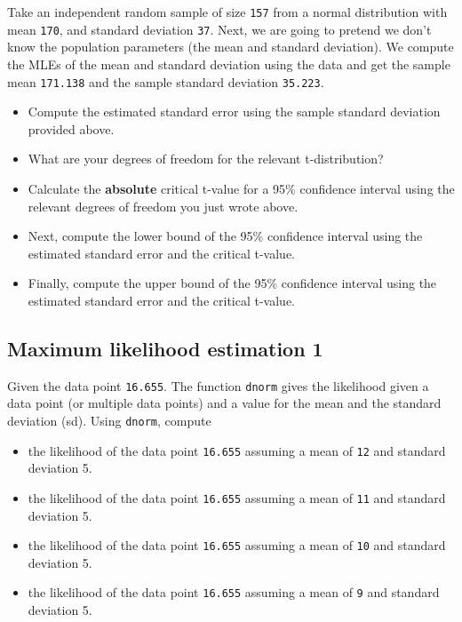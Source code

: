 \documentclass[12pt,]{krantz}
\providecommand{\tightlist}{%
  \setlength{\itemsep}{0pt}\setlength{\parskip}{0pt}}
\begin{document}
Take an independent random sample of size \texttt{157} from a normal distribution
with mean \texttt{170}, and standard deviation \texttt{37}. Next, we are going to pretend we don't know the population parameters (the mean and standard deviation). We compute the MLEs of the mean and standard deviation using the data and get the sample mean \texttt{171.138} and the sample standard deviation \texttt{35.223}.

\begin{itemize}
\tightlist
\item
  Compute the estimated standard error using the sample standard deviation provided above.
\item
  What are your degrees of freedom for the relevant t-distribution?
\item
  Calculate the \textbf{absolute} critical t-value for a 95\% confidence interval using the relevant degrees of freedom you just wrote above.
\item
  Next, compute the lower bound of the 95\% confidence interval using the estimated standard error and the critical t-value.
\item
  Finally, compute the upper bound of the 95\% confidence interval using the estimated standard error and the critical t-value.
\end{itemize}

\hypertarget{sec:FoundationsexercisesMLE1}{%
\subsection{Maximum likelihood estimation 1}\label{sec:FoundationsexercisesMLE1}}

Given the data point \texttt{16.655}.
The function \texttt{dnorm} gives the likelihood given a data point (or multiple data points) and a value for the mean and the standard deviation (sd). Using \texttt{dnorm}, compute

\begin{itemize}
\tightlist
\item
  the likelihood of the data point \texttt{16.655} assuming a mean of \texttt{12} and standard deviation 5.
\item
  the likelihood of the data point \texttt{16.655} assuming a mean of \texttt{11} and standard deviation 5.
\item
  the likelihood of the data point \texttt{16.655} assuming a mean of \texttt{10} and standard deviation 5.
\item
  the likelihood of the data point \texttt{16.655} assuming a mean of \texttt{9} and standard deviation 5.
\end{itemize}
\end{document}
